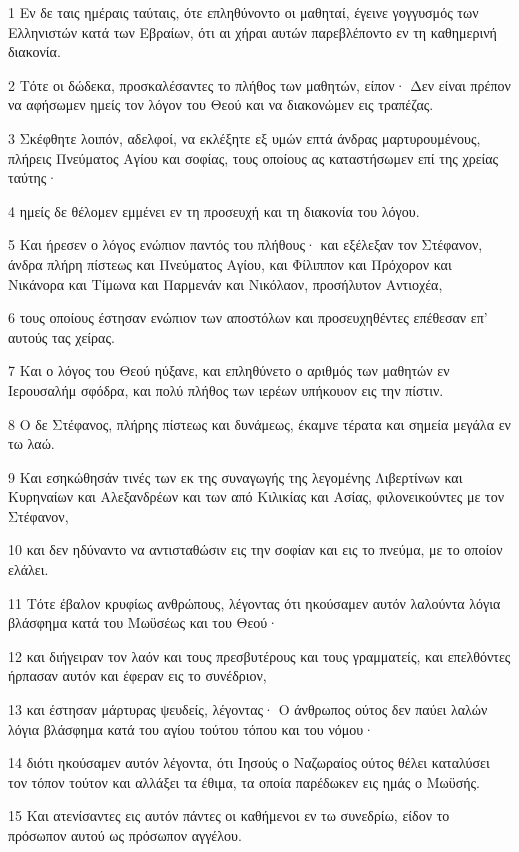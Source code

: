 \par 1 Εν δε ταις ημέραις ταύταις, ότε επληθύνοντο οι μαθηταί, έγεινε γογγυσμός των Ελληνιστών κατά των Εβραίων, ότι αι χήραι αυτών παρεβλέποντο εν τη καθημερινή διακονία.
\par 2 Τότε οι δώδεκα, προσκαλέσαντες το πλήθος των μαθητών, είπον· Δεν είναι πρέπον να αφήσωμεν ημείς τον λόγον του Θεού και να διακονώμεν εις τραπέζας.
\par 3 Σκέφθητε λοιπόν, αδελφοί, να εκλέξητε εξ υμών επτά άνδρας μαρτυρουμένους, πλήρεις Πνεύματος Αγίου και σοφίας, τους οποίους ας καταστήσωμεν επί της χρείας ταύτης·
\par 4 ημείς δε θέλομεν εμμένει εν τη προσευχή και τη διακονία του λόγου.
\par 5 Και ήρεσεν ο λόγος ενώπιον παντός του πλήθους· και εξέλεξαν τον Στέφανον, άνδρα πλήρη πίστεως και Πνεύματος Αγίου, και Φίλιππον και Πρόχορον και Νικάνορα και Τίμωνα και Παρμενάν και Νικόλαον, προσήλυτον Αντιοχέα,
\par 6 τους οποίους έστησαν ενώπιον των αποστόλων και προσευχηθέντες επέθεσαν επ' αυτούς τας χείρας.
\par 7 Και ο λόγος του Θεού ηύξανε, και επληθύνετο ο αριθμός των μαθητών εν Ιερουσαλήμ σφόδρα, και πολύ πλήθος των ιερέων υπήκουον εις την πίστιν.
\par 8 Ο δε Στέφανος, πλήρης πίστεως και δυνάμεως, έκαμνε τέρατα και σημεία μεγάλα εν τω λαώ.
\par 9 Και εσηκώθησάν τινές των εκ της συναγωγής της λεγομένης Λιβερτίνων και Κυρηναίων και Αλεξανδρέων και των από Κιλικίας και Ασίας, φιλονεικούντες με τον Στέφανον,
\par 10 και δεν ηδύναντο να αντισταθώσιν εις την σοφίαν και εις το πνεύμα, με το οποίον ελάλει.
\par 11 Τότε έβαλον κρυφίως ανθρώπους, λέγοντας ότι ηκούσαμεν αυτόν λαλούντα λόγια βλάσφημα κατά του Μωϋσέως και του Θεού·
\par 12 και διήγειραν τον λαόν και τους πρεσβυτέρους και τους γραμματείς, και επελθόντες ήρπασαν αυτόν και έφεραν εις το συνέδριον,
\par 13 και έστησαν μάρτυρας ψευδείς, λέγοντας· Ο άνθρωπος ούτος δεν παύει λαλών λόγια βλάσφημα κατά του αγίου τούτου τόπου και του νόμου·
\par 14 διότι ηκούσαμεν αυτόν λέγοντα, ότι Ιησούς ο Ναζωραίος ούτος θέλει καταλύσει τον τόπον τούτον και αλλάξει τα έθιμα, τα οποία παρέδωκεν εις ημάς ο Μωϋσής.
\par 15 Και ατενίσαντες εις αυτόν πάντες οι καθήμενοι εν τω συνεδρίω, είδον το πρόσωπον αυτού ως πρόσωπον αγγέλου.

